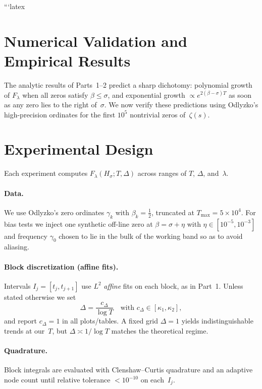 ```latex

\section{Numerical Validation and Empirical Results}

The analytic results of Parts~1–2 predict a sharp dichotomy:
polynomial growth of $F_\lambda$ when all zeros satisfy $\beta\le\sigma$,
and exponential growth $\propto e^{2(\beta-\sigma)T}$ as soon as any zero
lies to the right of~$\sigma$. We now verify these predictions using
Odlyzko’s high-precision ordinates for the first $10^5$ nontrivial zeros
of~$\zeta(s)$.

\section{Experimental Design}

Each experiment computes $F_\lambda(H_\sigma;T,\Delta)$
across ranges of $T$, $\Delta$, and~$\lambda$.

\paragraph{Data.}
We use Odlyzko’s zero ordinates $\gamma_k$ with $\beta_k=\tfrac12$,
truncated at $T_{\max}=5\times10^4$.
For bias tests we inject one synthetic off-line zero at
$\beta=\sigma+\eta$ with $\eta\in[10^{-5},10^{-3}]$ and frequency $\gamma_0$
chosen to lie in the bulk of the working band so as to avoid aliasing.

\paragraph{Block discretization (affine fits).}
Intervals $I_j=[t_j,t_{j+1}]$ use $L^2$ \emph{affine} fits on each block,
as in Part~1. Unless stated otherwise we set
\[
\Delta=\frac{c_\Delta}{\log T}\quad\text{with } c_\Delta\in[\kappa_1,\kappa_2],
\]
and report $c_\Delta=1$ in all plots/tables. A fixed grid $\Delta=1$
yields indistinguishable trends at our~$T$, but $\Delta\asymp1/\log T$
matches the theoretical regime.

\paragraph{Quadrature.}
Block integrals are evaluated with Clenshaw–Curtis quadrature and an
adaptive node count until relative tolerance $<10^{-10}$ on each~$I_j$.

